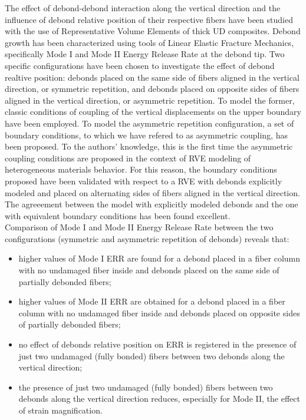 \documentclass[smallextended]{svjour3}       %
\begin{document}
The effect of debond-debond interaction along the vertical direction and the influence of debond relative position of their respective fibers have been studied with the use of Representative Volume Elements of thick UD composites. Debond growth has been characterized using tools of Linear Elastic Fracture Mechanics, specifically Mode I and Mode II Energy Release Rate at the debond tip. Two specific configurations have been chosen to investigate the effect of debond realtive position: debonds placed on the same side of fibers aligned in the vertical direction, or symmetric repetition, and debonds placed on opposite sides of fibers aligned in the vertical direction, or asymmetric repetition. To model the former, classic conditions of coupling of the vertical displacements on the upper boundary have been employed. To model the asymmetric repetition configuration, a set of boundary conditions, to which we have refered to as asymmetric coupling, has been proposed. To the authors' knowledge, this is the first time the asymmetric coupling conditions are proposed in the context of RVE modeling of heterogeneous materials behavior. For this reason, the boundary conditions proposed have been validated with respect to a RVE with debonds explicitly modeled and placed on alternating sides of fibers aligned in the vertical direction. The agreeement between the model with explicitly modeled debonds and the one with equivalent boundary conditions has been found excellent.\\
Comparison of Mode I and Mode II Energy Release Rate between the two configurations (symmetric and asymmetric repetition of debonds) reveals that:

\begin{itemize}
\item higher values of Mode I ERR are found for a debond placed in a fiber column with no undamaged fiber inside and debonds placed on the same side of partially debonded fibers;
\item higher values of Mode II ERR are obtained for a debond placed in a fiber column with no undamaged fiber inside and debonds placed on opposite sides of partially debonded fibers;
\item no effect of debonds relative position on ERR is registered in the presence of just two undamaged (fully bonded) fibers between two debonds along the vertical direction;
\item the presence of just two undamaged (fully bonded) fibers between two debonds along the vertical direction reduces, especially for Mode II, the effect of strain magnification.
\end{itemize}
\end{document}
